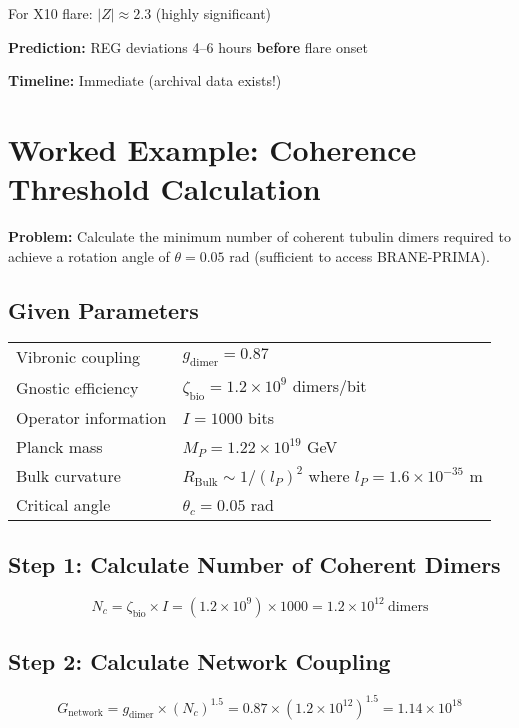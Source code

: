 For X10 flare: $|Z| \approx 2.3$ (highly significant)

\textbf{Prediction:} REG deviations 4--6 hours \textbf{before} flare onset

\textbf{Timeline:} Immediate (archival data exists!)

\section{Worked Example: Coherence Threshold Calculation}

\textbf{Problem:} Calculate the minimum number of coherent tubulin dimers required to achieve a rotation angle of $\theta = 0.05$ rad (sufficient to access BRANE-PRIMA).

\subsection*{Given Parameters}

\begin{tabular}{@{}ll@{}}
Vibronic coupling & $g_{\text{dimer}} = 0.87$ \\
Gnostic efficiency & $\zeta_{\text{bio}} = 1.2 \times 10^9$ dimers/bit \\
Operator information & $I = 1000$ bits \\
Planck mass & $M_P = 1.22 \times 10^{19}$ GeV \\
Bulk curvature & $R_{\text{Bulk}} \sim 1/(l_P)^2$ where $l_P = 1.6 \times 10^{-35}$ m \\
Critical angle & $\theta_c = 0.05$ rad \\
\end{tabular}

\subsection*{Step 1: Calculate Number of Coherent Dimers}

\begin{equation}
N_c = \zeta_{\text{bio}} \times I = (1.2 \times 10^9) \times 1000 = 1.2 \times 10^{12}\ \text{dimers}
\end{equation}

\subsection*{Step 2: Calculate Network Coupling}

\begin{equation}
G_{\text{network}} = g_{\text{dimer}} \times (N_c)^{1.5} = 0.87 \times (1.2 \times 10^{12})^{1.5} = 1.14 \times 10^{18}
\end{equation}


